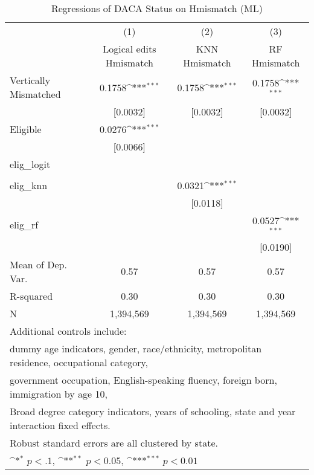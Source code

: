 \begin{table}[htbp]\centering
\def\sym#1{\ifmmode^{#1}\else\(^{#1}\)\fi}
\caption{Regressions of DACA Status on Hmismatch (ML)}
\begin{tabular}{l*{3}{c}}
\toprule
                    &\multicolumn{1}{c}{(1)}         &\multicolumn{1}{c}{(2)}         &\multicolumn{1}{c}{(3)}         \\
                    &Logical edits Hmismatch         &KNN Hmismatch         &RF Hmismatch         \\
\midrule
Vertically Mismatched&      0.1758\sym{***}&      0.1758\sym{***}&      0.1758\sym{***}\\
                    &    [0.0032]         &    [0.0032]         &    [0.0032]         \\
\addlinespace
Eligible            &      0.0276\sym{***}&                     &                     \\
                    &    [0.0066]         &                     &                     \\
\addlinespace
elig\_logit          &                     &                     &                     \\
                    &                     &                     &                     \\
\addlinespace
elig\_knn            &                     &      0.0321\sym{***}&                     \\
                    &                     &    [0.0118]         &                     \\
\addlinespace
elig\_rf             &                     &                     &      0.0527\sym{***}\\
                    &                     &                     &    [0.0190]         \\
\midrule
Mean of Dep. Var.   &        0.57         &        0.57         &        0.57         \\
R-squared           &        0.30         &        0.30         &        0.30         \\
N                   &   1,394,569         &   1,394,569         &   1,394,569         \\
\bottomrule
\multicolumn{4}{l}{\footnotesize Additional controls include:}\\
\multicolumn{4}{l}{\footnotesize dummy age indicators, gender, race/ethnicity, metropolitan residence, occupational category,}\\
\multicolumn{4}{l}{\footnotesize government occupation, English-speaking fluency, foreign born, immigration by age 10,}\\
\multicolumn{4}{l}{\footnotesize Broad degree category indicators, years of schooling, state and year interaction fixed effects.}\\
\multicolumn{4}{l}{\footnotesize Robust standard errors are all clustered by state.}\\
\multicolumn{4}{l}{\footnotesize \sym{*} \(p<.1\), \sym{**} \(p<0.05\), \sym{***} \(p<0.01\)}\\
\end{tabular}
\end{table}
